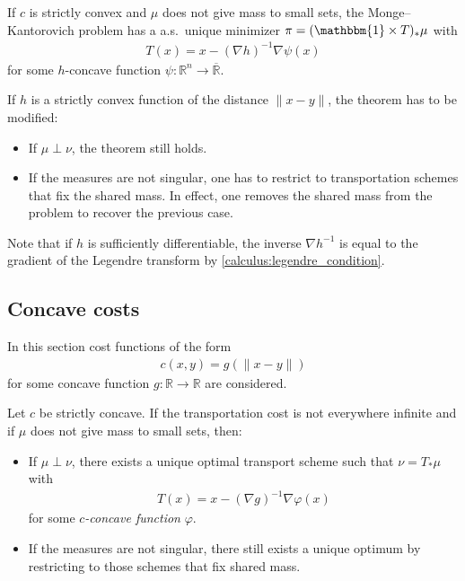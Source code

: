     \begin{theorem}
        If $c$ is strictly convex and $\mu$ does not give mass to small sets, the Monge--Kantorovich problem has a a.s.~unique minimizer $\pi = (\mathbbm{1}\times T)_\ast\mu$ with
        \begin{gather}
            T(x) = x - (\nabla h)^{-1}\nabla\psi(x)
        \end{gather}
        for some $h$-concave function $\psi:\mathbb{R}^n\rightarrow\overline{\mathbb{R}}$.
    \end{theorem}
    \begin{remark}
        If $h$ is a strictly convex function of the distance $\|x-y\|$, the theorem has to be modified:
        \begin{itemize}
            \item If $\mu\perp\nu$, the theorem still holds.
            \item If the measures are not singular, one has to restrict to transportation schemes that fix the shared mass. In effect, one removes the shared mass from the problem to recover the previous case.
        \end{itemize}
    \end{remark}
    Note that if $h$ is sufficiently differentiable, the inverse $\nabla h^{-1}$ is equal to the gradient of the Legendre transform by \cref{calculus:legendre_condition}.

\subsection{Concave costs}

    In this section cost functions of the form
    \begin{gather}
        c(x,y) = g(\|x-y\|)
    \end{gather}
    for some concave function $g:\mathbb{R}\rightarrow\mathbb{R}$ are considered.

    \begin{property}
        Let $c$ be strictly concave. If the transportation cost is not everywhere infinite and if $\mu$ does not give mass to small sets, then:
        \begin{itemize}
            \item If $\mu\perp\nu$, there exists a unique optimal transport scheme such that $\nu = T_\ast\mu$ with
            \begin{gather}
                T(x) = x - (\nabla g)^{-1}\nabla\varphi(x)
            \end{gather}
            for some \textit{$c$-concave function} $\varphi$.
            \item If the measures are not singular, there still exists a unique optimum by restricting to those schemes that fix shared mass.
        \end{itemize}
    \end{property}

